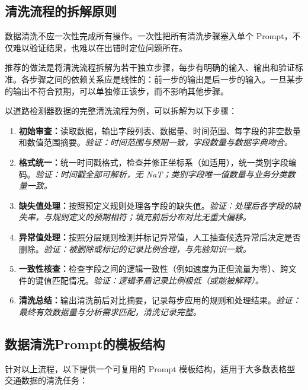 \subsection{清洗流程的拆解原则}

数据清洗不应一次性完成所有操作。一次性把所有清洗步骤塞入单个 Prompt，不仅难以验证结果，也难以在出错时定位问题所在。

推荐的做法是将清洗流程拆解为若干独立步骤，每步有明确的输入、输出和验证标准。各步骤之间的依赖关系应是线性的：前一步的输出是后一步的输入。一旦某步的输出不符合预期，可以单独修正该步，而不影响其他步骤。

以道路检测器数据的完整清洗流程为例，可以拆解为以下步骤：

\begin{enumerate}
  \item \textbf{初始审查：}读取数据，输出字段列表、数据量、时间范围、每字段的非空数量和数值范围摘要。\textit{验证：时间范围与预期一致，字段数量与数据字典吻合。}
  \item \textbf{格式统一：}统一时间戳格式，检查并修正坐标系（如适用），统一类别字段编码。\textit{验证：时间戳全部可解析，无 NaT；类别字段唯一值数量与业务分类数量一致。}
  \item \textbf{缺失值处理：}按照预定义规则处理各字段的缺失值。\textit{验证：处理后各字段的缺失率，与规则定义的预期相符；填充前后分布对比无重大偏移。}
  \item \textbf{异常值处理：}按照分层规则检测并标记异常值，人工抽查候选异常后决定是否删除。\textit{验证：被删除或标记的记录比例合理，与先验知识一致。}
  \item \textbf{一致性核查：}检查字段之间的逻辑一致性（例如速度为正但流量为零）、跨文件的键值匹配情况。\textit{验证：逻辑矛盾记录比例极低（或能被解释）。}
  \item \textbf{清洗总结：}输出清洗前后对比摘要，记录每步应用的规则和处理结果。\textit{验证：最终有效数据量与分析需求匹配，清洗记录完整。}
\end{enumerate}

\subsection{数据清洗Prompt的模板结构}

针对以上流程，以下提供一个可复用的 Prompt 模板结构，适用于大多数表格型交通数据的清洗任务：

